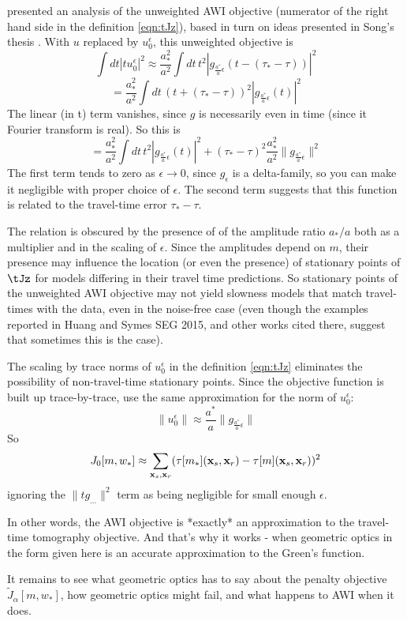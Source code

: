 \cite{HuangSymes:SEG15a} presented an analysis of the unweighted AWI objective (numerator of the right hand side in the definition \ref{eqn:tJz}), based in turn on ideas presented in Song's thesis \cite[]{Song:94c}. With $u$ replaced by $u_0^{\epsilon}$,  this unweighted objective is
$$
\int dt |tu_0^{\epsilon}|^2 \approx \frac{a_*^2}{a^2} \int dt\, t^2|g_{\frac{a^*}{a}\epsilon}(t-(\tau_*-\tau))|^2
$$
$$
=\frac{a_*^2}{a^2} \int dt\, (t+(\tau_*-\tau))^2|g_{\frac{a^*}{a}\epsilon}(t)|^2
$$
The linear (in t) term vanishes, since $g$ is necessarily even in time (since it Fourier transform is real). So this is
$$
=\frac{a_*^2}{a^2} \int dt\, t^2|g_{\frac{a^*}{a}\epsilon}(t)|^2
+(\tau_*-\tau)^2\frac{a_*^2}{a^2}\|g_{\frac{a^*}{a}\epsilon}\|^2
$$
The first term tends to zero as $\epsilon \rightarrow 0$, since $g_{\epsilon}$ is a delta-family, so you can make it negligible with proper choice of $\epsilon$. The second term suggests that this function is related to the travel-time error $\tau_*-\tau$.

The relation is obscured by the presence of of the amplitude ratio $a_*/a$ both as a multiplier and in the scaling of $\epsilon$. Since the amplitudes depend on $m$, their presence may influence the location (or even the presence) of  stationary points of $\tJz$ for models differing in their travel time predictions. So stationary points of the unweighted AWI objective may not yield slowness models that match travel-times with the data, even in the noise-free case (even though the examples reported in Huang and Symes SEG 2015, and other works cited there, suggest that sometimes this is the case). 

The scaling by trace norms of $u_0^{\epsilon}$ in the definition \ref{eqn:tJz} eliminates the possibility of non-travel-time stationary points. Since the objective function is built up trace-by-trace, use the same approximation for the norm of $u_0^{\epsilon}$: 
$$
\|u_0^{\epsilon}\| \approx \frac{a^*}{a}\|g_{\frac{a^*}{a}\epsilon}\|
$$
So
$$
J_0[m,w_*] \approx \sum_{{\bf x}_s,{\bf x}_r} (\tau[m_*]({\bf x}_s,{\bf x}_r)-\tau[m]({\bf x}_s,{\bf x}_r))^2
$$
ignoring the $\|tg_{...}\|^2$ term as being negligible for small enough $\epsilon$. 

In other words, the AWI objective is *exactly* an approximation to the travel-time tomography objective. And that's why it works - when geometric optics in the form given here is an accurate approximation to the Green's function.

It remains to see what geometric optics has to say about the penalty objective $\tilde{J}_{\alpha}[m,w_*]$, how geometric optics might fail, and what happens to AWI when it does.

